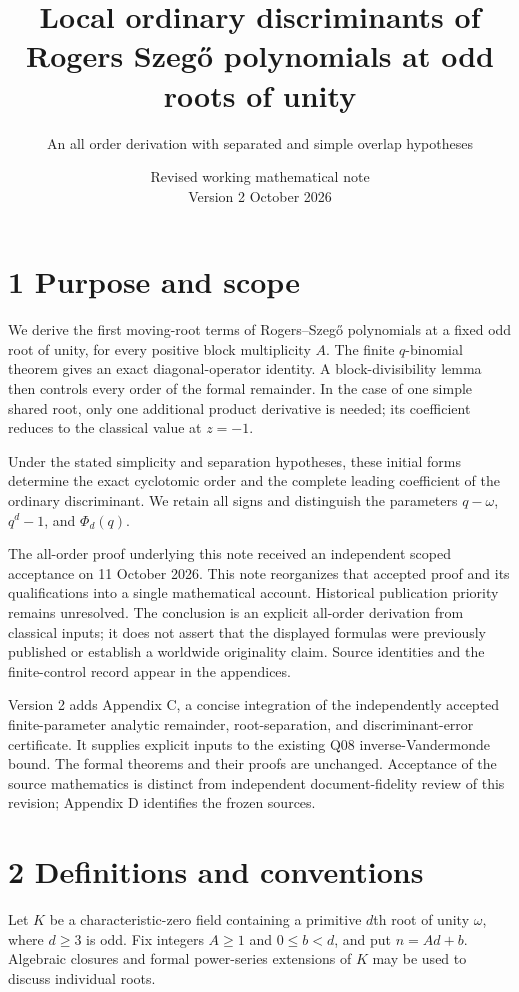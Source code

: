 \documentclass[
  11pt,
]{article}
\title{Local ordinary discriminants of Rogers Szegő polynomials at odd
roots of unity}
\subtitle{An all order derivation with separated and simple overlap
hypotheses}
\author{}
\date{Revised working mathematical note\\Version 2 \quad 11 October 2026}
\begin{document}
\maketitle

\section{1 Purpose and scope}\label{purpose-and-scope}

We derive the first moving-root terms of Rogers--Szegő polynomials at a
fixed odd root of unity, for every positive block multiplicity \(A\).
The finite \(q\)-binomial theorem gives an exact diagonal-operator
identity. A block-divisibility lemma then controls every order of the
formal remainder. In the case of one simple shared root, only one
additional product derivative is needed; its coefficient reduces to the
classical value at \(z=-1\).

Under the stated simplicity and separation hypotheses, these initial
forms determine the exact cyclotomic order and the complete leading
coefficient of the ordinary discriminant. We retain all signs and
distinguish the parameters \(q-\omega\), \(q^d-1\), and \(\Phi_d(q)\).

The all-order proof underlying this note received an independent scoped
acceptance on 11 October 2026. This note reorganizes that accepted proof
and its qualifications into a single mathematical account. Historical
publication priority remains unresolved. The conclusion is an explicit
all-order derivation from classical inputs; it does not assert that the
displayed formulas were previously published or establish a worldwide
originality claim. Source identities and the finite-control record
appear in the appendices.

Version 2 adds Appendix C, a concise integration of the independently
accepted finite-parameter analytic remainder, root-separation, and
discriminant-error certificate. It supplies explicit inputs to the
existing Q08 inverse-Vandermonde bound. The formal theorems and their
proofs are unchanged. Acceptance of the source mathematics is distinct
from independent document-fidelity review of this revision; Appendix D
identifies the frozen sources.

\section{2 Definitions and
conventions}\label{definitions-and-conventions}

Let \(K\) be a characteristic-zero field containing a primitive \(d\)th
root of unity \(\omega\), where \(d\geq 3\) is odd. Fix integers
\(A\geq 1\) and \(0\leq b<d\), and put \(n=Ad+b\). Algebraic closures
and formal power-series extensions of \(K\) may be used to discuss
individual roots.
\end{document}
